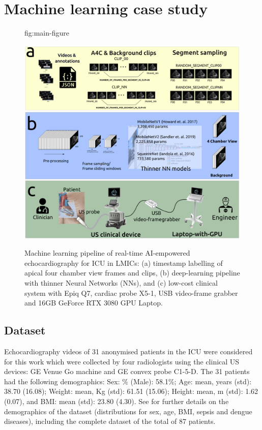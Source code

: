 \documentclass[mlabstract,twocolumn]{jmlr}
\begin{document}
\section{Machine learning case study}
\begin{figure}[t]%
\floatconts
  {fig:main-figure}
  {\caption{
      Machine learning pipeline of real-time AI-empowered echocardiography for ICU in LMICs:
      (a) timestamp labelling of apical four chamber view frames and clips,
      (b) deep-learning pipeline with thinner Neural Networks (NNs), and
      (c) low-cost clinical system with Epiq Q7, cardiac probe X5-1, USB video-frame grabber and 16GB GeForce RTX 3080 GPU Laptop.
    }
  }
  {\includegraphics[width=\columnwidth]{../figures/main-figure/versions/drawing-v03}}%
\end{figure}
\subsection{Dataset}
Echocardiography videos of 31 anonymised patients in the ICU were considered for this work which were collected by four radiologists using the clinical US devices: GE Venue Go machine and GE convex probe C1-5-D.
The 31 patients had the following demographics:
Sex: \% (Male): 58.1\%;
Age: mean, years (std): 38.70 (16.08);
Weight: mean, Kg (std): 61.51 (15.06);
Height: mean, m (std): 1.62 (0.07), and 
BMI: mean (std): 23.80 (4.30).
See  for further details on the demographics of the dataset (distributions for sex, age, BMI, sepsis and dengue diseases), including the complete dataset of the total of 87 patients.
\end{document}
